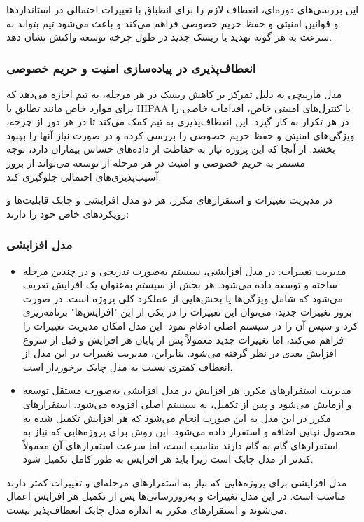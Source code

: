 این بررسی‌های دوره‌ای، انعطاف لازم را برای انطباق با تغییرات احتمالی در استانداردها و قوانین امنیتی و حفظ حریم خصوصی فراهم می‌کند و باعث می‌شود تیم بتواند به سرعت به هر گونه تهدید یا ریسک جدید در طول چرخه توسعه واکنش نشان دهد.



\subsubsection*{انعطاف‌پذیری در پیاده‌سازی امنیت و حریم خصوصی}
مدل مارپیچی به دلیل تمرکز بر کاهش ریسک در هر مرحله، به تیم اجازه می‌دهد که برای موارد خاص مانند تطابق با HIPAA یا کنترل‌های امنیتی خاص، اقدامات خاصی را در هر تکرار به کار گیرد. این انعطاف‌پذیری به تیم کمک می‌کند تا در هر دور از چرخه، ویژگی‌های امنیتی و حفظ حریم خصوصی را بررسی کرده و در صورت نیاز آنها را بهبود بخشد. از آنجا که این پروژه نیاز به حفاظت از داده‌های حساس بیماران دارد، توجه مستمر به حریم خصوصی و امنیت در هر مرحله از توسعه می‌تواند از بروز آسیب‌پذیری‌های احتمالی جلوگیری کند.

در مدیریت تغییرات و استقرارهای مکرر، هر دو مدل افزایشی و چابک قابلیت‌ها و رویکردهای خاص خود را دارند:

\subsubsection*{مدل افزایشی}
\begin{itemize}
    \item مدیریت تغییرات: در مدل افزایشی، سیستم به‌صورت تدریجی و در چندین مرحله ساخته و توسعه داده می‌شود. هر بخش از سیستم به‌عنوان یک افزایش تعریف می‌شود که شامل ویژگی‌ها یا بخش‌هایی از عملکرد کلی پروژه است. در صورت بروز تغییرات جدید، می‌توان این تغییرات را در یکی از این "افزایش‌ها" برنامه‌ریزی کرد و سپس آن را در سیستم اصلی ادغام نمود. این مدل امکان مدیریت تغییرات را فراهم می‌کند، اما تغییرات جدید معمولاً پس از پایان هر افزایش و قبل از شروع افزایش بعدی در نظر گرفته می‌شود. بنابراین، مدیریت تغییرات در این مدل از انعطاف کمتری نسبت به مدل چابک برخوردار است.
    \item مدیریت استقرارهای مکرر: هر افزایش در مدل افزایشی به‌صورت مستقل توسعه و آزمایش می‌شود و پس از تکمیل، به سیستم اصلی افزوده می‌شود. استقرارهای مکرر در این مدل به این صورت انجام می‌شود که هر افزایش تکمیل شده به محصول نهایی اضافه و استقرار داده می‌شود. این روش برای پروژه‌هایی که نیاز به استقرار‌های گام به گام دارند مناسب است، اما سرعت استقرار‌های آن معمولاً کندتر از مدل چابک است زیرا باید هر افزایش به طور کامل تکمیل شود.
\end{itemize}
مدل افزایشی برای پروژه‌هایی که نیاز به استقرارهای مرحله‌ای و تغییرات کمتر دارند مناسب است. در این مدل تغییرات و به‌روزرسانی‌ها پس از تکمیل هر افزایش اعمال می‌شوند و استقرارهای مکرر به اندازه مدل چابک انعطاف‌پذیر نیست.
